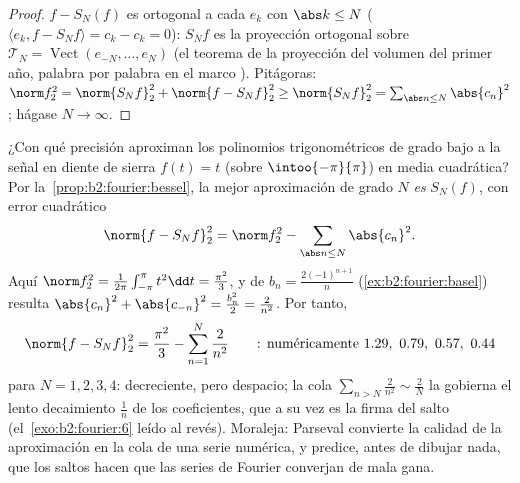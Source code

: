 \begin{proof}
$f - S_N(f)$ es ortogonal a cada $e_k$ con $\abs k \leq N$ ($\langle
e_k, f - S_N f\rangle = c_k - c_k = 0$): $S_Nf$ es la proyección
ortogonal sobre $\mathcal{T}_N = \operatorname{Vect}(e_{-N}, \dots,
e_N)$ (el teorema de la proyección del volumen del primer año,
palabra por palabra en el marco ). Pitágoras: $\norm f_2^2 =
\norm{S_Nf}_2^2 + \norm{f - S_Nf}_2^2 \geq \norm{S_Nf}_2^2 =
\sum_{\abs n \leq N} \abs{c_n}^2$; hágase $N \to \infty$.
\end{proof}

\begin{example}\label{ex:b2:fourier:bestapprox}
¿Con qué precisión aproximan los polinomios trigonométricos de grado
bajo a la señal en diente de sierra $f(t) = t$ (sobre
$\intoo{-\pi}{\pi}$) en media cuadrática? Por la~\cref{prop:b2:fourier:bessel}, la mejor aproximación de grado $N$
\emph{es} $S_N(f)$, con error cuadrático
\[
\norm{f - S_Nf}_2^2 = \norm f_2^2 -
\sum_{\abs n\leq N}\abs{c_n}^2 .
\]
Aquí $\norm f_2^2 = \frac{1}{2\pi}\int_{-\pi}^\pi t^2\dd t =
\frac{\pi^2}{3}$, y de $b_n = \frac{2(-1)^{n+1}}{n}$
(\cref{ex:b2:fourier:basel}) resulta $\abs{c_n}^2 + \abs{c_{-n}}^2 =
\frac{b_n^2}{2} = \frac{2}{n^2}$. Por tanto,
\[
\norm{f - S_Nf}_2^2
= \frac{\pi^2}{3} - \sum_{n=1}^{N}\frac{2}{n^2}
\qquad\text{: numéricamente } 1.29,\ 0.79,\ 0.57,\ 0.44
\]
para $N = 1, 2, 3, 4$: decreciente, pero despacio; la cola
$\sum_{n>N}\frac2{n^2} \sim \frac2N$ la gobierna el lento decaimiento
$\frac1n$ de los coeficientes, que a su vez es la firma del salto (el~\cref{exo:b2:fourier:6} leído al revés). Moraleja: Parseval convierte
la calidad de la aproximación en la cola de una serie numérica, y
predice, antes de dibujar nada, que los saltos hacen que las series de
Fourier converjan de mala gana.
\end{example}

